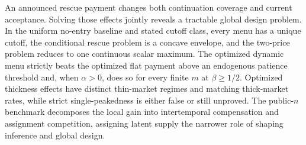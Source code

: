 \documentclass[mnsc,dblanonrev]{informs4}
\begin{document}
An announced rescue payment changes both continuation coverage and current
acceptance.  Solving those effects jointly reveals a tractable global design
problem.  In the uniform no-entry baseline and stated cutoff class, every menu
has a unique cutoff, the conditional rescue problem is a concave envelope, and
the two-price problem reduces to one continuous scalar maximum.  The optimized
dynamic menu strictly beats the optimized flat payment above an endogenous
patience threshold and, when $\alpha>0$, does so for every finite $m$ at
$\beta\ge1/2$.  Optimized thickness effects have distinct
thin-market regimes and matching thick-market rates, while strict
single-peakedness is either false or still unproved.  The public-$n$
benchmark decomposes the local gain into intertemporal compensation and
assignment competition, assigning latent supply the narrower role of shaping
inference and global design.
\end{document}
